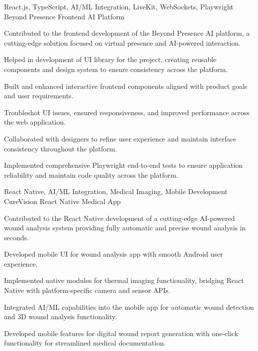\begin{cventries}
  \cventry
    {React.js, TypeScript, AI/ML Integration, LiveKit, WebSockets, Playwright} %
    {Beyond Presence} %
    {Frontend AI Platform} %
    {}
    {
      \begin{cvitems} %
        \item {Contributed to the frontend development of the Beyond Presence AI platform, a cutting-edge solution focused on virtual presence and AI-powered interaction.}
        \item {Helped in development of UI library for the project, creating reusable components and design system to ensure consistency across the platform.}
        \item {Built and enhanced interactive frontend components aligned with product goals and user requirements.}
        \item {Troubleshot UI issues, ensured responsiveness, and improved performance across the web application.}
        \item {Collaborated with designers to refine user experience and maintain interface consistency throughout the platform.}
        \item {Implemented comprehensive Playwright end-to-end tests to ensure application reliability and maintain code quality across the platform.}
      \end{cvitems}
    }


  \cventry
    {React Native, AI/ML Integration, Medical Imaging, Mobile Development} %
    {CureVision} %
    {React Native Medical App} %
    {} %
    {
      \begin{cvitems} %
        \item {Contributed to the React Native development of a cutting-edge AI-powered wound analysis system providing fully automatic and precise wound analysis in seconds.}
        \item {Developed mobile UI for wound analysis app with smooth Android user experience.}
        \item {Implemented native modules for thermal imaging functionality, bridging React Native with platform-specific camera and sensor APIs.}
        \item {Integrated AI/ML capabilities into the mobile app for automatic wound detection and 3D wound analysis functionality.}
        \item {Developed mobile features for digital wound report generation with one-click functionality for streamlined medical documentation.}
      \end{cvitems}
    }

\end{cventries} 